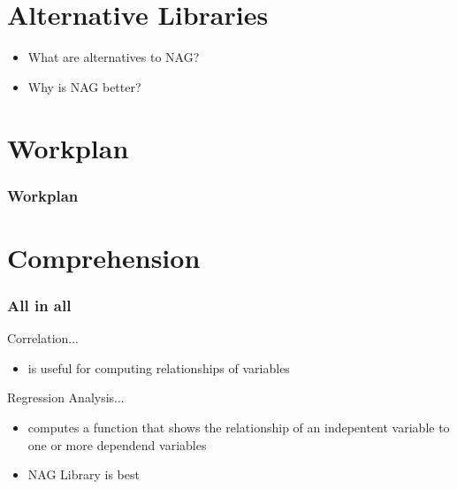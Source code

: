 \documentclass{beamer}
\begin{document}
\section{Alternative Libraries}

\begin{frame}
 \begin{itemize}
  \item What are alternatives to NAG?
  \item Why is NAG better?
 \end{itemize}

\end{frame}


\section{Workplan}

\begin{frame}
 \frametitle{Workplan}	
\end{frame}


\section{Comprehension}

\begin{frame}
 \frametitle{All in all}
 
 \begin{block}{Correlation...}
  \begin{itemize}
   \item is useful for computing relationships of variables
  \end{itemize}
 \end{block}

 \begin{block}{Regression Analysis...}
  \begin{itemize}
   \item computes a function that shows the relationship of an indepentent variable to one or more dependend variables
  \end{itemize}
 \end{block}

 \begin{itemize}
  \item NAG Library is best
 \end{itemize}

\end{frame}
\end{document}
